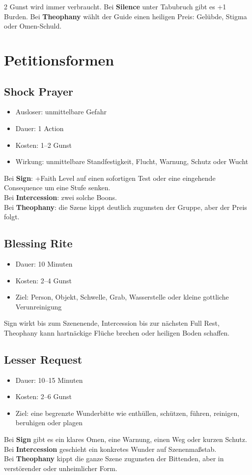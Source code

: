 \begin{multicols*}{2}
Gunst wird immer verbraucht. Bei \textbf{Silence} unter Tabubruch gibt es +1 Burden. Bei \textbf{Theophany} wählt der Guide einen heiligen Preis: Gelübde, Stigma oder Omen-Schuld.

\section{Petitionsformen}
\subsection{Shock Prayer}
\begin{itemize}[leftmargin=*]
\item Ausloser: unmittelbare Gefahr
\item Dauer: 1 Action
\item Kosten: 1--2 Gunst
\item Wirkung: unmittelbare Standfestigkeit, Flucht, Warnung, Schutz oder Wucht
\end{itemize}
Bei \textbf{Sign}: +Faith Level auf einen sofortigen Test oder eine eingehende Consequence um eine Stufe senken.\\
Bei \textbf{Intercession}: zwei solche Boons.\\
Bei \textbf{Theophany}: die Szene kippt deutlich zugunsten der Gruppe, aber der Preis folgt.

\subsection{Blessing Rite}
\begin{itemize}[leftmargin=*]
\item Dauer: 10 Minuten
\item Kosten: 2--4 Gunst
\item Ziel: Person, Objekt, Schwelle, Grab, Wasserstelle oder kleine gottliche Verunreinigung
\end{itemize}
Sign wirkt bis zum Szenenende, Intercession bis zur nächsten Full Rest, Theophany kann hartnäckige Flüche brechen oder heiligen Boden schaffen.

\subsection{Lesser Request}
\begin{itemize}[leftmargin=*]
\item Dauer: 10--15 Minuten
\item Kosten: 2--6 Gunst
\item Ziel: eine begrenzte Wunderbitte wie enthüllen, schützen, führen, reinigen, beruhigen oder plagen
\end{itemize}
Bei \textbf{Sign} gibt es ein klares Omen, eine Warnung, einen Weg oder kurzen Schutz.\\
Bei \textbf{Intercession} geschieht ein konkretes Wunder auf Szenenmaßstab.\\
Bei \textbf{Theophany} kippt die ganze Szene zugunsten der Bittenden, aber in verstörender oder unheimlicher Form.


\end{multicols*}
